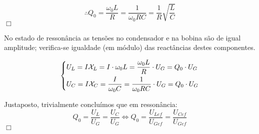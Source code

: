 $$
\therefore Q_0 = \frac{\omega_0 L}{R} = \frac{1}{\omega_0 RC} = \frac{1}{R}\sqrt{\frac{L}{C}}
$$
\hfill \ensuremath{\Box}

No estado de ressonância as tensões no condensador e na bobina são de igual amplitude; verifica-se igualdade (em módulo) das reactâncias destes componentes.

$$
\begin{dcases*}
U_L = I \mathcal{X}_L = I\cdot \omega_0 L = \frac{\omega_0 L}{R}\cdot U_G = Q_0\cdot U_G\\
U_C = I \mathcal{X}_C = \frac{I}{\omega_0 C} = \frac{1}{\omega_0 RC}\cdot U_G = Q_0\cdot U_G
\end{dcases*}
$$

Justaposto, trivialmente concluímos que em ressonância: 
$$ 
Q_0 = \dfrac{U_L}{U_G} = \dfrac{U_C}{U_G} \iff Q_0 = \dfrac{U_{Lef}}{U_{Gef}} = \dfrac{U_{Cef}}{U_{Gef}}
$$
\hfill \ensuremath{\Box}

